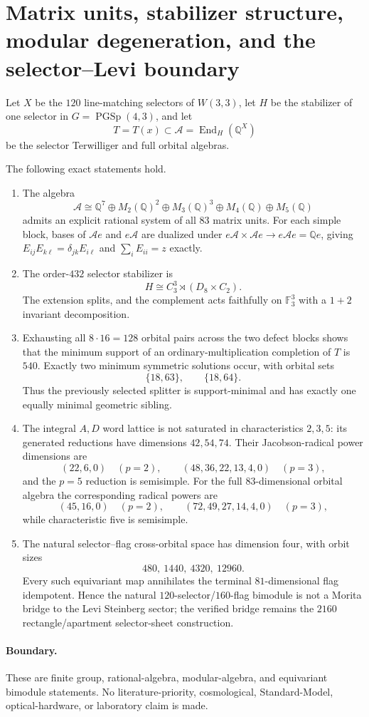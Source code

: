 \section{Matrix units, stabilizer structure, modular degeneration, and the selector--Levi boundary}
\label{sec:bt1370-bt1374-five-frontiers}

Let $X$ be the $120$ line-matching selectors of $W(3,3)$, let
$H$ be the stabilizer of one selector in $G=\operatorname{PGSp}(4,3)$,
and let
\[
T=T(x)\subset \mathcal A=\operatorname{End}_H(\mathbb Q^X)
\]
be the selector Terwilliger and full orbital algebras.

\begin{theorem}
The following exact statements hold.
\begin{enumerate}
\item The algebra
\[
\mathcal A\cong
\mathbb Q^7\oplus M_2(\mathbb Q)^2\oplus M_3(\mathbb Q)^3
\oplus M_4(\mathbb Q)\oplus M_5(\mathbb Q)
\]
admits an explicit rational system of all $83$ matrix units. For each
simple block, bases of $\mathcal Ae$ and $e\mathcal A$ are dualized under
$e\mathcal A\times\mathcal Ae\to e\mathcal Ae=\mathbb Qe$, giving
$E_{ij}E_{k\ell}=\delta_{jk}E_{i\ell}$ and $\sum_iE_{ii}=z$ exactly.

\item The order-$432$ selector stabilizer is
\[
H\cong C_3^3\rtimes(D_8\times C_2).
\]
The extension splits, and the complement acts faithfully on
$\mathbb F_3^3$ with a $1+2$ invariant decomposition.

\item Exhausting all $8\cdot16=128$ orbital pairs across the two defect
blocks shows that the minimum support of an ordinary-multiplication
completion of $T$ is $540$. Exactly two minimum symmetric solutions
occur, with orbital sets
\[
\{18,63\},\qquad \{18,64\}.
\]
Thus the previously selected splitter is support-minimal and has exactly
one equally minimal geometric sibling.

\item The integral $A,D$ word lattice is not saturated in characteristics
$2,3,5$: its generated reductions have dimensions $42,54,74$. Their
Jacobson-radical power dimensions are
\[
(22,6,0)\quad(p=2),
\qquad
(48,36,22,13,4,0)\quad(p=3),
\]
and the $p=5$ reduction is semisimple. For the full $83$-dimensional
orbital algebra the corresponding radical powers are
\[
(45,16,0)\quad(p=2),
\qquad
(72,49,27,14,4,0)\quad(p=3),
\]
while characteristic five is semisimple.

\item The natural selector--flag cross-orbital space has dimension four,
with orbit sizes
\[
480,\ 1440,\ 4320,\ 12960.
\]
Every such equivariant map annihilates the terminal $81$-dimensional flag
idempotent. Hence the natural $120$-selector/$160$-flag bimodule is not a
Morita bridge to the Levi Steinberg sector; the verified bridge remains
the $2160$ rectangle/apartment selector-sheet construction.
\end{enumerate}
\end{theorem}

\paragraph{Boundary.}
These are finite group, rational-algebra, modular-algebra, and equivariant
bimodule statements. No literature-priority, cosmological, Standard-Model,
optical-hardware, or laboratory claim is made.
